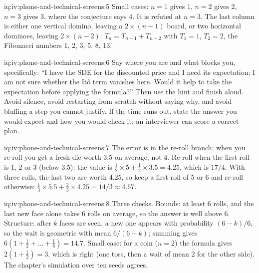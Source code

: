 \begin{solution}{iq:iv:phone-and-technical-screens:5}
Small cases: $n = 1$ gives 1, $n = 2$ gives 2, $n = 3$ gives 3, where the conjecture says 4. It is refuted at
$n = 3$. The last column is either one vertical domino, leaving a $2 \times (n-1)$ board, or two horizontal
dominoes, leaving $2 \times (n-2)$: $T_n = T_{n-1} + T_{n-2}$ with $T_1 = 1$, $T_2 = 2$, the Fibonacci numbers
1, 2, 3, 5, 8, 13.
\end{solution}

\begin{solution}{iq:iv:phone-and-technical-screens:6}
Say where you are and what blocks you, specifically: ``I have the SDE for the discounted price and I need its
expectation; I am not sure whether the Itô term vanishes here. Would it help to take the expectation before
applying the formula?'' Then use the hint and finish aloud. Avoid silence, avoid restarting from scratch
without saying why, and avoid bluffing a step you cannot justify. If the time runs out, state the answer you
would expect and how you would check it: an interviewer can score a correct plan.
\end{solution}

\begin{solution}{iq:iv:phone-and-technical-screens:7}
The error is in the re-roll branch: when you re-roll you get a fresh die worth 3.5 on average, not 4. Re-roll
when the first roll is 1, 2 or 3 (below 3.5): the value is $\tfrac12 \times 5 + \tfrac12 \times 3.5 = 4.25$,
which is $17/4$. With three rolls, the last two are worth 4.25, so keep a first roll of 5 or 6 and re-roll
otherwise: $\tfrac13 \times 5.5 + \tfrac23 \times 4.25 = 14/3 \approx 4.67$.
\end{solution}

\begin{solution}{iq:iv:phone-and-technical-screens:8}
Three checks. Bounds: at least 6 rolls, and the last new face alone takes 6 rolls on average, so the answer is
well above 6. Structure: after $k$ faces are seen, a new one appears with probability $(6 - k)/6$, so the wait
is geometric with mean $6/(6-k)$; summing gives $6(1 + \tfrac12 + \dots + \tfrac16) = 14.7$. Small case: for a
coin ($n = 2$) the formula gives $2(1 + \tfrac12) = 3$, which is right (one toss, then a wait of mean 2 for
the other side). The chapter's simulation over ten seeds agrees.
\end{solution}
